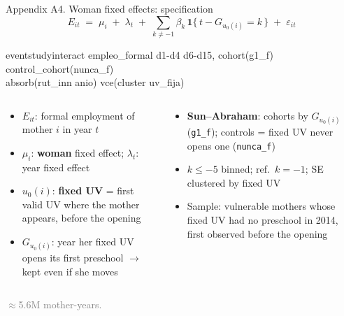 \documentclass[aspectratio=169,10pt]{beamer}
\newcommand{\fuente}[1]{\vspace{2pt}\textcolor{graytext}{\scriptsize #1}}
\newcommand{\takeaway}[1]{\par\vspace{6pt}{\small\textcolor{steel}{$\Rightarrow$}\ \textbf{\textcolor{navy}{#1}}}}
\begin{document}
\begin{frame}{Appendix A4. Woman fixed effects: specification}
\[
E_{it} \;=\; \mu_i \;+\; \lambda_t \;+\; \sum_{k \neq -1} \beta_k \, \mathbf{1}\{\, t - G_{u_0(i)} = k \,\} \;+\; \varepsilon_{it}
\]
\vspace{-4pt}
\begin{center}
\colorbox{bgpanel}{\parbox{0.92\linewidth}{\scriptsize\ttfamily
eventstudyinteract empleo\_formal d1-d4 d6-d15, cohort(g1\_f) control\_cohort(nunca\_f) \\
\hspace*{2em}absorb(rut\_inn anio) vce(cluster uv\_fija)}}
\end{center}
\vspace{-4pt}
\begin{columns}[T]
\begin{column}{0.52\textwidth}
\begin{itemize}
  \footnotesize
  \item $E_{it}$: formal employment of mother $i$ in year $t$
  \item $\mu_i$: \textbf{woman} fixed effect; $\lambda_t$: year fixed effect
  \item $u_0(i)$: \textbf{fixed UV} = first valid UV where the mother appears, before the opening
  \item $G_{u_0(i)}$: year her fixed UV opens its first preschool $\to$ kept even if she moves
\end{itemize}
\end{column}
\begin{column}{0.46\textwidth}
\begin{itemize}
  \footnotesize
  \item \textbf{Sun--Abraham}: cohorts by $G_{u_0(i)}$ (\texttt{g1\_f}); controls = fixed UV never opens one (\texttt{nunca\_f})
  \item $k \leq -5$ binned; ref.\ $k=-1$; SE clustered by fixed UV
  \item Sample: vulnerable mothers whose fixed UV had no preschool in 2014, first observed before the opening
\end{itemize}
\end{column}
\end{columns}
\takeaway{Each mother is compared with herself, treated by the first UV where she appears.}
\par\fuente{$\approx$5.6M mother-years.}
\end{frame}
\end{document}
